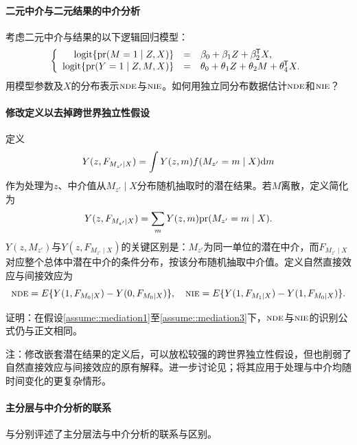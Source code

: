\paragraph{二元中介与二元结果的中介分析}
\label{para::mediation-binaryMY}

考虑二元中介与结果的以下逻辑回归模型：
$$
\left\{\begin{array}{rcl}
\textup{logit}\{ \textup{pr}(M  = 1\mid Z, X) \}&=&  \beta_0 + \beta_1 Z + \beta_2^{\mkern-1.5mu\mathsf{T}} X, \\
\textup{logit} \{ \textup{pr}(Y = 1 \mid Z,M,X ) \} &=& \theta_0 + \theta_1 Z + \theta_2 M +   \theta_4^{\mkern-1.5mu\mathsf{T}} X.
\end{array}\right.
$$
用模型参数及$X$的分布表示$\textsc{nde}$与$\textsc{nie}$。如何用独立同分布数据估计$\textsc{nde}$和$\textsc{nie}$？



  
\paragraph{修改定义以去掉跨世界独立性假设}\label{problem::no-crossworld-modification}


定义
$$
Y(z, F_{M_{z'}\mid X}) = \int Y(z,m) f(M_{z'} = m\mid X) \textnormal{d} m
$$
作为处理为$z$、中介值从$M_{z'}\mid X$分布随机抽取时的潜在结果。若$M$离散，定义简化为
$$
Y(z, F_{M_{z'}\mid X}) =\sum_m Y(z,m) \textup{pr}(M_{z'} = m\mid X).
$$
$Y(z,M_{z'})$与$Y(z, F_{M_{z'}\mid X}) $的关键区别是：$M_{z'}$为同一单位的潜在中介，而$F_{M_{z'}\mid X}$对应整个总体中潜在中介的条件分布，按该分布随机抽取中介值。定义自然直接效应与间接效应为
$$
\textsc{nde} = E\{Y(1, F_{M_{0}\mid X})  - Y(0, F_{M_{0}\mid X})   \},\quad
\textsc{nie}  =  E\{Y(1, F_{M_{1}\mid X})  - Y(1, F_{M_{0}\mid X})   \}.
$$


证明：在假设\ref{assume::mediation1}至\ref{assume::mediation3}下，$\textsc{nde}$与$\textsc{nie}$的识别公式仍与正文相同。 



注：修改嵌套潜在结果的定义后，可以放松较强的跨世界独立性假设，但也削弱了自然直接效应与间接效应的原有解释。进一步讨论见\citet{vanderweele2015explanation}；\citet{vanderweele2017mediation}将其应用于处理与中介均随时间变化的更复杂情形。

  
  
\paragraph{主分层与中介分析的联系}

\citet{vanderweele2008simple}与\citet{forastiere2018principal}分别评述了主分层法与中介分析的联系与区别。 
